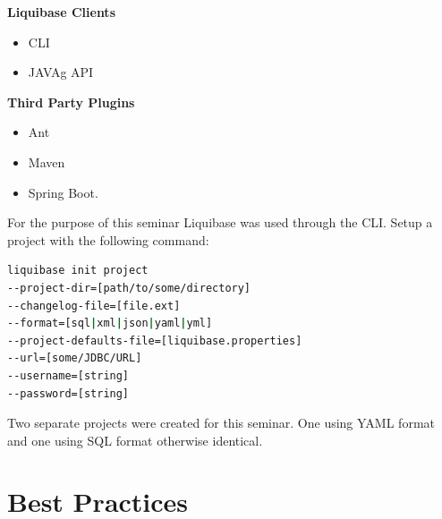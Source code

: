 \begin{minipage}[t]{0.5\textwidth}
	\textbf{Liquibase Clients}	
	\begin{itemize}
		\item \Gls{CLI}
		\item \gls{JAVAg} \acrshort{API}
	\end{itemize}
\end{minipage}
\begin{minipage}[t]{0.5\textwidth}
	\textbf{Third Party Plugins}
	\begin{itemize}
		\item Ant
		\item Maven
		\item Spring Boot.
	\end{itemize}
\end{minipage}
\vspace{0.3cm}

%
For the purpose of this seminar Liquibase was used through the \gls{CLI}. Setup a project with the following command: 

\begin{lstlisting}[language=bash]
liquibase init project
--project-dir=[path/to/some/directory]
--changelog-file=[file.ext]
--format=[sql|xml|json|yaml|yml]
--project-defaults-file=[liquibase.properties]
--url=[some/JDBC/URL]
--username=[string]
--password=[string]
\end{lstlisting}

Two separate projects were created for this seminar. One using YAML format and one using \gls{SQL} format otherwise identical.

\section{Best Practices}


\newpage